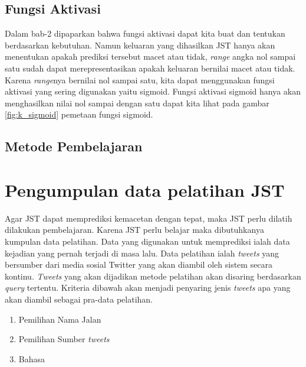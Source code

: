 \subsection{Fungsi Aktivasi}
Dalam bab-2 dipaparkan bahwa fungsi aktivasi dapat kita buat dan tentukan berdasarkan kebutuhan. Namun keluaran yang dihasilkan JST hanya akan menentukan apakah prediksi tersebut macet atau tidak, \textit{range} angka nol sampai satu sudah dapat merepresentasikan apakah keluaran bernilai macet atau tidak. Karena \textit{range}nya bernilai nol sampai satu, kita dapat menggunakan fungsi aktivasi yang sering digunakan yaitu sigmoid. Fungsi aktivasi sigmoid hanya akan menghasilkan nilai nol sampai dengan satu dapat kita lihat pada gambar \ref{fig:k_sigmoid} pemetaan fungsi sigmoid.
\subsection{Metode Pembelajaran}
\section{Pengumpulan data pelatihan JST}
Agar JST dapat memprediksi kemacetan dengan tepat, maka JST perlu dilatih dilakukan pembelajaran. Karena JST perlu belajar maka dibutuhkanya kumpulan data pelatihan. Data yang digunakan untuk memprediksi ialah data kejadian yang pernah terjadi di masa lalu. Data pelatihan ialah \textit{tweets} yang bersumber dari media sosial Twitter yang akan diambil oleh sistem secara kontinu. \textit{Tweets} yang akan dijadikan metode pelatihan akan disaring berdasarkan \textit{query} tertentu. Kriteria dibawah akan menjadi penyaring jenis \textit{tweets} apa yang akan diambil sebagai pra-data pelatihan.
\begin{enumerate}
	\item Pemilihan Nama Jalan
	\item Pemilihan Sumber \textit{tweets}
	\item Bahasa
\end{enumerate}

